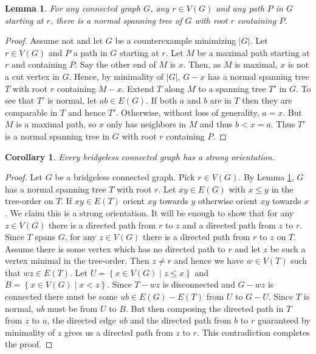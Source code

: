 \documentclass[12pt]{article}
\theoremstyle{plain}
\newtheorem{lem}[thm]{Lemma}
\newtheorem{cor}[thm]{Corollary}
\theoremstyle{definition}
\theoremstyle{remark}
\newcommand{\setb}[3]{\left\{ #1 \in #2 \mid #3 \right\}}
\newcommand{\card}[1]{\left|#1\right|}
\begin{document}
\begin{lem}\label{NormalTreesExist}
For any connected graph $G$, any $r \in V(G)$ and any path $P$ in $G$ starting at $r$, there is a normal spanning tree of $G$ with root $r$ containing $P$.
\end{lem}
\begin{proof}
Assume not and let $G$ be a counterexample minimizing $\card{G}$. Let $r \in V(G)$ and $P$ a path in $G$ starting at $r$. Let $M$ be a maximal path starting at $r$ and containing $P$.  Say the other end of $M$ is $x$.  Then, as $M$ is maximal, $x$ is not a cut vertex in $G$.  Hence, by minimality of $\card{G}$, $G-x$ has a normal spanning tree $T$ with root $r$ containing $M - x$.  Extend $T$ along $M$ to a spanning tree $T'$ in $G$.  To see that $T'$ is normal, let $ab \in E(G)$. If both $a$ and $b$ are in $T$ then they are comparable in $T$ and hence $T'$.  Otherwise, without loss of generality, $a = x$.  But $M$ is a maximal path, so $x$ only has neighbors in $M$ and thus $b < x = a$.  Thus $T'$ is a normal spanning tree in $G$ with root $r$ containing $P$.
\end{proof}

\begin{cor}
Every bridgeless connected graph has a strong orientation. 
\end{cor}
\begin{proof}
Let $G$ be a bridgeless connected graph.
Pick $r \in V(G)$. By Lemma \ref{NormalTreesExist}, $G$ has a normal spanning tree $T$ with root $r$.  Let $xy \in E(G)$ with $x \leq y$ in the tree-order on $T$.  If $xy \in E(T)$ orient $xy$ towards $y$ otherwise orient $xy$ towards $x$.  We claim this is a strong orientation.  It will be enough to show that for any $z \in V(G)$ there is a directed path from $r$ to $z$ and a directed path from $z$ to $r$.  Since $T$ spans $G$, for any $z \in V(G)$ there is a directed path from $r$ to $z$ on $T$.  Assume there is some vertex which has no directed path to $r$ and let $z$ be such a vertex minimal in the tree-order.  Then $z \neq r$ and hence we have $w \in V(T)$ such that $wz \in E(T)$. Let $U = \setb{x}{V(G)}{z \leq x}$ and $B = \setb{x}{V(G)}{x < z}$.  Since $T - wz$ is disconnected and $G - wz$ is connected there must be some $ub \in E(G) - E(T)$ from $U$ to $G-U$. Since $T$ is normal, $ub$ must be from $U$ to $B$.  But then composing the directed path in $T$ from $z$ to $u$, the directed edge $ub$ and the directed path from $b$ to $r$ guaranteed by minimality of $z$ gives us a directed path from $z$ to $r$.  This contradiction completes the proof.
\end{proof}
\end{document}
